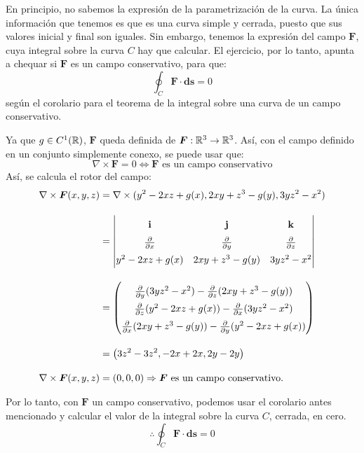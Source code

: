 \begin{solution}
    En principio, no sabemos la expresión de la parametrización de la curva. La única información que tenemos es que es una curva simple y cerrada, puesto que sus valores inicial y final son iguales.
    Sin embargo, tenemos la expresión del campo $\boldsymbol{F}$, cuya integral sobre la curva $C$ hay que calcular. El ejercicio, por lo tanto, apunta a chequar si $\boldsymbol{F}$ es un campo conservativo, para que:
    \begin{equation*}
        \oint_{C}\boldsymbol{F}\cdot\boldsymbol{ds}=0
    \end{equation*}
    según el corolario para el teorema de la integral sobre una curva de un campo conservativo.

    Ya que $g \in C^1(\mathbb{R})$, $\boldsymbol{F}$ queda definida de $\boldsymbol{F}:\mathbb{R}^3\rightarrow\mathbb{R}^3$. Así, con el campo definido en un conjunto simplemente conexo, se puede usar que:
    \begin{equation*}
        \nabla \times \boldsymbol{F} = 0 \Leftrightarrow \boldsymbol{F} \text{ es un campo conservativo}
    \end{equation*}
    Así, se calcula el rotor del campo:
    \begin{align*}
        \nabla \times \boldsymbol{F}(x,y,z) &= \nabla \times (y^2-2xz+g(x),2xy+z^3-g(y),3yz^2-x^2)\\[10pt]
        &=  \renewcommand{\arraystretch}{1.5} \begin{vmatrix}
                \mathbf{i} & \mathbf{j} & \mathbf{k} \\
                \partialx & \partialy & \partialz \\
                y^2-2xz+g(x) & 2xy+z^3-g(y) & 3yz^2-x^2
            \end{vmatrix} \\[10pt]
    &= \renewcommand{\arraystretch}{1.5} \begin{pmatrix}
        \partialy(3yz^2-x^2) - \partialz(2xy+z^3-g(y)) \\
        \partialz(y^2-2xz+g(x)) - \partialx(3yz^2-x^2) \\
        \partialx(2xy+z^3-g(y)) - \partialy(y^2-2xz+g(x))
        \end{pmatrix}\\[10pt]
    &= \left(3z^2-3z^2,-2x+2x,2y-2y\right)\\[10pt]
    \nabla \times \boldsymbol{F}(x,y,z) &= (0,0,0) \Rightarrow \boldsymbol{F} \text{ es un campo conservativo.}
    \end{align*}

    Por lo tanto, con $\boldsymbol{F}$ un campo conservativo, podemos usar el corolario antes mencionado y calcular el valor de la integral sobre la curva $C$, cerrada, en cero.
    \begin{equation*}
       \therefore \oint_{C}\boldsymbol{F}\cdot\boldsymbol{ds}=0
    \end{equation*}
\end{solution}

